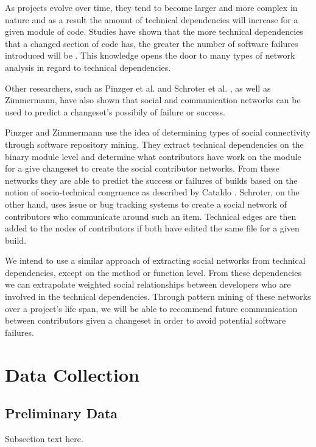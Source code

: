 \documentclass[conference]{IEEEtran}
\begin{document}
As projects evolve over time, they tend to become larger and more complex in nature and as
a result the amount of technical dependencies will increase for a given module of code.
Studies have shown that the more technical dependencies that a changed section of code has,
the greater the number of software failures introduced will be \cite{Zimmermann:2008:PDU}. 
This knowledge opens the door to many types of network analysis in regard to technical dependencies.

Other researchers, such as Pinzger et al. \cite{Pinzger:2008:DNP} and Schroter et al.
 \cite{Schroter:2010:PBO}, as well as Zimmermann\cite{Zimmermann:2008:PDU}, have also shown that
social and communication networks can be used to predict a changeset's possibily of failure or
success.

Pinzger and Zimmermann use the idea of determining types of social connectivity through 
software repository mining. They extract technical dependencies on the binary module level and
determine what contributors have work on the module for a give changeset to create the social
contributor networks. From these networks they are able to predict the success or failures of
builds based on the notion of socio-technical congruence as described by Cataldo \cite{Cataldo:2006:ICR}.
Schroter, on the other hand, uses issue or bug tracking systems to create a social network of
contributors who communicate around such an item. Technical edges are then added to the
nodes of contributors if both have edited the same file for a given build.

We intend to use a similar approach of extracting social networks from technical dependencies, 
except on the method or function level. From these dependencies we can extrapolate weighted
social relationships between developers who are involved in the technical dependencies. Through
pattern mining of these networks over a project's life span, we will be able to recommend future
communication between contributors given a changeset in order to avoid potential software
failures.


\section{Data Collection}

\subsection{Preliminary Data}
Subsection text here.
\end{document}
